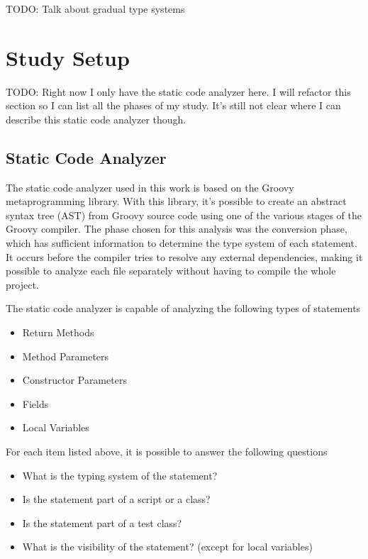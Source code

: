 \documentclass[preprint]{sigplanconf}
\begin{document}
TODO: Talk about gradual type systems \cite{gray05,gray08,gray11,siek07,takikawa12}

\section{Study Setup\label{sec:Configura=0000E7=0000E3o-do-Estudo}}
TODO: Right now I only have the static code analyzer here. I will refactor this section so I can list all the phases of my study. It's still not clear where I can describe this static code analyzer though.

\subsection{Static Code Analyzer}
The static code analyzer used in this work is based on the Groovy metaprogramming library. 
With this library, it's possible to create an abstract syntax tree (AST) from Groovy source code using one of the various stages of the Groovy compiler.
The phase chosen for this analysis was the conversion phase, which has sufficient information to determine the type system of each statement.
It occurs before the compiler tries to resolve any external dependencies, making it possible to analyze each file separately without having to compile the whole project.

The static code analyzer is capable of analyzing the following types of statements
\begin{itemize}
	\item Return Methods
	\item Method Parameters
	\item Constructor Parameters
	\item Fields
	\item Local Variables
\end{itemize}

For each item listed above, it is possible to answer the following questions
\begin{itemize}
	\item What is the typing system of the statement?
	\item Is the statement part of a script or a class?
	\item Is the statement part of a test class?
	\item What is the visibility of the statement? (except for local variables)
\end{itemize}
\end{document}
